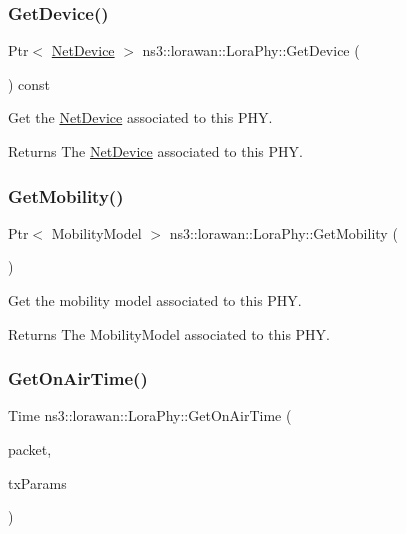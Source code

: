 \subsubsection{\texorpdfstring{Get\+Device()}{GetDevice()}}
{\footnotesize\ttfamily Ptr$<$ \hyperlink{classNetDevice}{Net\+Device} $>$ ns3\+::lorawan\+::\+Lora\+Phy\+::\+Get\+Device (\begin{DoxyParamCaption}\item[{void}]{ }\end{DoxyParamCaption}) const}

Get the \hyperlink{classNetDevice}{Net\+Device} associated to this P\+HY.

\begin{DoxyReturn}{Returns}
The \hyperlink{classNetDevice}{Net\+Device} associated to this P\+HY. 
\end{DoxyReturn}
\mbox{\label{classns3_1_1lorawan_1_1LoraPhy_adc4767610ff2a4b7b55dc49d2adf6a2f}} 
\subsubsection{\texorpdfstring{Get\+Mobility()}{GetMobility()}}
{\footnotesize\ttfamily Ptr$<$ Mobility\+Model $>$ ns3\+::lorawan\+::\+Lora\+Phy\+::\+Get\+Mobility (\begin{DoxyParamCaption}\item[{void}]{ }\end{DoxyParamCaption})}

Get the mobility model associated to this P\+HY.

\begin{DoxyReturn}{Returns}
The Mobility\+Model associated to this P\+HY. 
\end{DoxyReturn}
\mbox{\label{classns3_1_1lorawan_1_1LoraPhy_a305f1313d0694ab94193ac8c99f2cda6}} 
\subsubsection{\texorpdfstring{Get\+On\+Air\+Time()}{GetOnAirTime()}}
{\footnotesize\ttfamily Time ns3\+::lorawan\+::\+Lora\+Phy\+::\+Get\+On\+Air\+Time (\begin{DoxyParamCaption}\item[{Ptr$<$ Packet $>$}]{packet,  }\item[{\hyperlink{structns3_1_1lorawan_1_1LoraTxParameters}{Lora\+Tx\+Parameters}}]{tx\+Params }\end{DoxyParamCaption})\hspace{0.3cm}{\ttfamily [static]}}

